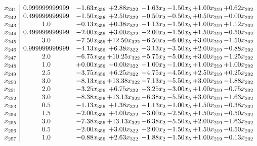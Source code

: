 \documentclass[8pt]{article}
\begin{document}
\[\begin{array}{c| c c@{\hskip 2pt} c@{\hskip 2pt} c@{\hskip 2pt} c@{\hskip 2pt} c@{\hskip 2pt} c@{\hskip 2pt} }
 x_{241}   &  0.999999999999 & -1.63 x_{356} & +  2.88 x_{322} & -1.63 x_{2} & -1.50 x_{5} & +  1.00 x_{219} & +  0.62 x_{202}\\
 x_{242}   &  0.499999999999 & -1.50 x_{356} & +  2.50 x_{322} & -0.50 x_{2} & -0.50 x_{5} & +  0.50 x_{219} & -0.00 x_{202}\\
 x_{243}   &  1.0 & -0.13 x_{356} & +  0.38 x_{322} & -1.13 x_{2} & -1.50 x_{5} & +  1.00 x_{219} & +  1.12 x_{202}\\
 x_{244}   &  0.499999999999 & -2.00 x_{356} & +  3.00 x_{322} & -2.00 x_{2} & -1.50 x_{5} & +  1.50 x_{219} & -0.50 x_{202}\\
 x_{245}   &  3.0 & -7.50 x_{356} & + 12.50 x_{322} & -6.50 x_{2} & -6.00 x_{5} & +  3.00 x_{219} & -1.50 x_{202}\\
 x_{246}   &  0.999999999999 & -4.13 x_{356} & +  6.38 x_{322} & -3.13 x_{2} & -3.50 x_{5} & +  2.00 x_{219} & -0.88 x_{202}\\
 x_{247}   &  2.0 & -6.75 x_{356} & + 10.25 x_{322} & -5.75 x_{2} & -5.00 x_{5} & +  3.00 x_{219} & -1.25 x_{202}\\
 x_{248}   &  1.0 & +  0.00 x_{356} & -0.00 x_{322} & -1.00 x_{2} & -1.00 x_{5} & +  1.00 x_{219} & +  1.00 x_{202}\\
 x_{249}   &  2.5 & -3.75 x_{356} & +  6.25 x_{322} & -4.75 x_{2} & -4.50 x_{5} & +  2.50 x_{219} & +  0.25 x_{202}\\
 x_{250}   &  3.0 & -8.13 x_{356} & + 13.38 x_{322} & -7.13 x_{2} & -5.50 x_{5} & +  3.00 x_{219} & -1.88 x_{202}\\
 x_{251}   &  2.0 & -3.25 x_{356} & +  6.75 x_{322} & -3.25 x_{2} & -3.00 x_{5} & +  1.00 x_{219} & -0.75 x_{202}\\
 x_{252}   &  3.0 & -8.38 x_{356} & + 13.13 x_{322} & -6.38 x_{2} & -5.50 x_{5} & +  3.00 x_{219} & -1.63 x_{202}\\
 x_{253}   &  0.5 & -1.13 x_{356} & +  1.38 x_{322} & -1.13 x_{2} & -1.00 x_{5} & +  1.50 x_{219} & -0.38 x_{202}\\
 x_{254}   &  1.5 & -2.00 x_{356} & +  4.00 x_{322} & -3.00 x_{2} & -2.50 x_{5} & +  1.50 x_{219} & -0.50 x_{202}\\
 x_{255}   &  3.0 & -7.38 x_{356} & + 13.13 x_{322} & -6.38 x_{2} & -5.50 x_{5} & +  2.00 x_{219} & -1.63 x_{202}\\
 x_{256}   &  0.5 & -2.00 x_{356} & +  3.00 x_{322} & -2.00 x_{2} & -1.50 x_{5} & +  1.50 x_{219} & -0.50 x_{202}\\
 x_{257}   &  1.0 & -0.88 x_{356} & +  2.63 x_{322} & -1.88 x_{2} & -1.50 x_{5} & +  1.00 x_{219} & -0.13 x_{202}\\

\end{array}\]
\end{document}
